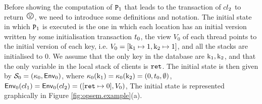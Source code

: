 Before showing the computation of $\texttt{P}_1$ that leads to the transaction of 
$cl_2$ to return ${\Large \frownie{}}$, we need to introduce some 
definitions and  notation.
The initial state in which $\texttt{P}_1$ is executed is the one in which 
each location has an initial version written by some initialisation transaction $t_0$, 
the view $V_0$ of each thread points to the initial version of each key, i.e. $V_0 = [\mathrm{k}_1 \mapsto 1, \mathrm{k}_2 \mapsto 1]$, 
and all the stacks are initialised to $0$. 
We assume that the only key in the database 
are $\mathrm{k}_1, \mathrm{k}_2$, and that the only variable in the local stack of clients is $\texttt{ret}$. 
The initial state is then given by $\mathcal{S}_0 = (\kappa_{0}, \mathsf{Env}_0)$, 
where $\kappa_{0}(\mathrm{k}_1) = \kappa_{0}(\mathrm{k}_2) =  (0, t_0, \emptyset)$,  
$\mathsf{Env}_0(cl_1) = \mathsf{Env}_0(cl_2) = ([\texttt{ret} \mapsto 0], V_0)$, 
The initial state is represented graphically in Figure \ref{fig:opsem.example}(a). 
%
%
%
%
%
%
%
%
